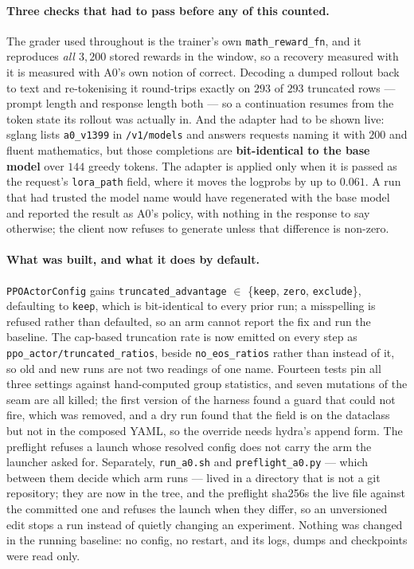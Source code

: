 \paragraph{Three checks that had to pass before any of this counted.} The grader used
throughout is the trainer's own \texttt{math\_reward\_fn}, and it reproduces \emph{all
$3{,}200$} stored rewards in the window, so a recovery measured with it is measured with A0's
own notion of correct. Decoding a dumped rollout back to text and re-tokenising it round-trips
exactly on $293$ of $293$ truncated rows --- prompt length and response length both --- so a
continuation resumes from the token state its rollout was actually in. And the adapter had to
be shown live: sglang lists \texttt{a0\_v1399} in \texttt{/v1/models} and answers requests
naming it with $200$ and fluent mathematics, but those completions are \textbf{bit-identical
to the base model} over $144$ greedy tokens. The adapter is applied only when it is passed as
the request's \texttt{lora\_path} field, where it moves the logprobs by up to $0.061$. A run
that had trusted the model name would have regenerated with the base model and reported the
result as A0's policy, with nothing in the response to say otherwise; the client now refuses
to generate unless that difference is non-zero.

\paragraph{What was built, and what it does by default.} \texttt{PPOActorConfig} gains
\texttt{truncated\_advantage} $\in$ \{\texttt{keep}, \texttt{zero}, \texttt{exclude}\},
defaulting to \texttt{keep}, which is bit-identical to every prior run; a misspelling is
refused rather than defaulted, so an arm cannot report the fix and run the baseline. The
cap-based truncation rate is now emitted on every step as
\texttt{ppo\_actor/truncated\_ratios}, beside \texttt{no\_eos\_ratios} rather than instead of
it, so old and new runs are not two readings of one name. Fourteen tests pin all three
settings against hand-computed group statistics, and seven mutations of the seam are all
killed; the first version of the harness found a guard that could not fire, which was
removed, and a dry run found that the field is on the dataclass but not in the composed YAML,
so the override needs hydra's append form. The preflight refuses a launch whose resolved
config does not carry the arm the launcher asked for. Separately, \texttt{run\_a0.sh} and
\texttt{preflight\_a0.py} --- which between them decide which arm runs --- lived in a
directory that is not a git repository; they are now in the tree, and the preflight sha256s
the live file against the committed one and refuses the launch when they differ, so an
unversioned edit stops a run instead of quietly changing an experiment. Nothing was changed
in the running baseline: no config, no restart, and its logs, dumps and checkpoints were read
only.

